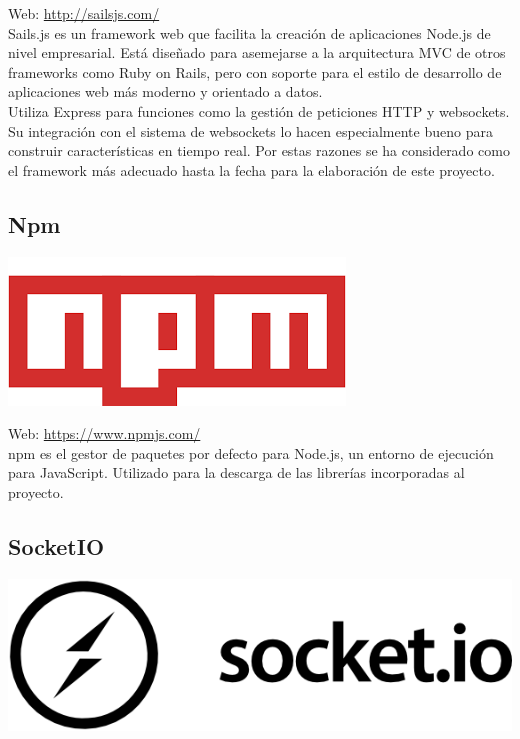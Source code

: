 Web: \url{http://sailsjs.com/}\\

Sails.js es un framework web que facilita la creación de aplicaciones Node.js de nivel empresarial. Está diseñado para asemejarse a la arquitectura MVC de otros frameworks como Ruby on Rails, pero con soporte para el estilo de desarrollo de aplicaciones web más moderno y orientado a datos.\\

Utiliza Express para funciones como la gestión de peticiones HTTP y websockets. Su integración con el sistema de websockets lo hacen especialmente bueno para construir características en tiempo real. Por estas razones se ha considerado como el framework más adecuado hasta la fecha para la elaboración de este proyecto.


\subsection{Npm}

\begin{center}
\includegraphics[scale=0.4]{imagenes/npm-logo.png}
\end{center}

Web: \url{https://www.npmjs.com/}\\

npm es el gestor de paquetes por defecto para Node.js, un entorno de ejecución para JavaScript. Utilizado para la descarga de las librerías incorporadas al proyecto.


\subsection{SocketIO}

\begin{center}
\includegraphics[scale=0.3]{imagenes/socketio-logo.png}
\end{center}

